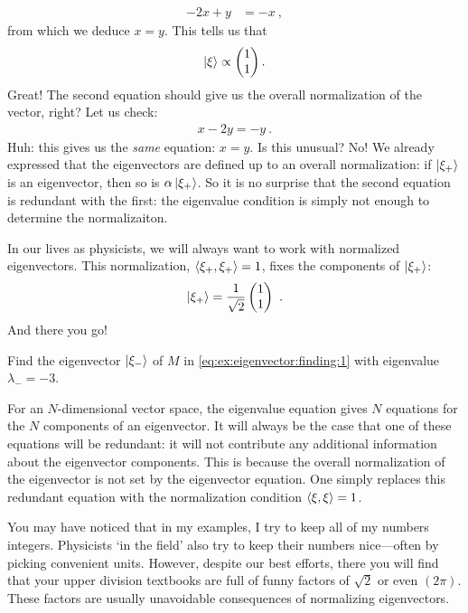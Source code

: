 \documentclass[12pt, oneside]{report}    %
\begin{document}
\begin{example}
\begin{align}
    -2x + y &= -x  \ ,
\end{align}
from which we deduce $x=y$. This tells us that
\begin{align}
    \left|\xi\right\rangle \propto \begin{pmatrix}
        1\\ 1
    \end{pmatrix} .
\end{align}
Great! The second equation should give us the overall normalization of the vector, right? Let us check:
\begin{align}
    x - 2y = -y \ .
\end{align}
Huh: this gives us the \emph{same} equation: $x=y$. Is this unusual? No! We already expressed that the eigenvectors are defined up to an overall normalization: if $\left|\xi_+\right\rangle$ is an eigenvector, then so is $\alpha\left|\xi_+\right\rangle$. So it is no surprise that the second equation is redundant with the first: the eigenvalue condition is simply not enough to determine the normalizaiton. 

In our lives as physicists, we will always want to work with normalized eigenvectors. This normalization, $\langle\xi_+,\xi_+\rangle = 1$, fixes the components of $\left|\xi_+\right\rangle$:
\begin{align}
    \left|\xi_+\right\rangle = 
    \frac{1}{\sqrt{2}}
    \begin{pmatrix}
        1 \\ 1
    \end{pmatrix} \ .
\end{align}
And there you go!
\end{example}


\begin{exercise}
Find the eigenvector $\left|\xi_-\right\rangle$ of $M$ in \eqref{eq:ex:eigenvector:finding:1} with eigenvalue $\lambda_- = -3$. 
\end{exercise}

For an $N$-dimensional vector space, the eigenvalue equation gives $N$ equations for the $N$ components of an eigenvector. It will always be the case that one of these equations will be redundant: it will not contribute any additional information about the eigenvector components. This is because the overall normalization of the eigenvector is not set by the eigenvector equation. One simply replaces this redundant equation with the normalization condition $\langle \xi,\xi\rangle = 1$. 

You may have noticed that in my examples, I try to keep all of my numbers integers. Physicists `in the field' also try to keep their numbers nice---often by picking convenient units. However, despite our best efforts, there you will find that your upper division textbooks are full of funny factors of $\sqrt{2}$ or even $(2\pi)$. These factors are usually unavoidable consequences of normalizing eigenvectors. 
\end{document}
